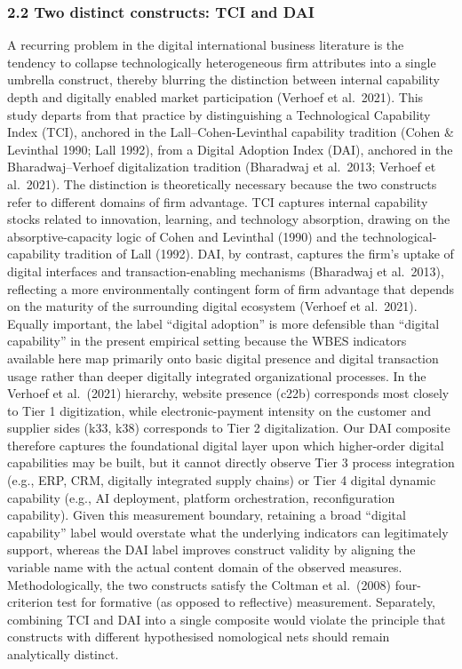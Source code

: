 \documentclass[
  12pt,a4paper]{article}
\begin{document}
\hypertarget{two-distinct-constructs-tci-and-dai}{%
\subsubsection{2.2 Two distinct constructs: TCI and
DAI}\label{two-distinct-constructs-tci-and-dai}}

A recurring problem in the digital international business literature is
the tendency to collapse technologically heterogeneous firm attributes
into a single umbrella construct, thereby blurring the distinction
between internal capability depth and digitally enabled market
participation (Verhoef et al.~2021). This study departs from that
practice by distinguishing a Technological Capability Index (TCI),
anchored in the Lall--Cohen-Levinthal capability tradition (Cohen \&
Levinthal 1990; Lall 1992), from a Digital Adoption Index (DAI),
anchored in the Bharadwaj--Verhoef digitalization tradition (Bharadwaj
et al.~2013; Verhoef et al.~2021). The distinction is theoretically
necessary because the two constructs refer to different domains of firm
advantage. TCI captures internal capability stocks related to
innovation, learning, and technology absorption, drawing on the
absorptive-capacity logic of Cohen and Levinthal (1990) and the
technological-capability tradition of Lall (1992). DAI, by contrast,
captures the firm's uptake of digital interfaces and
transaction-enabling mechanisms (Bharadwaj et al.~2013), reflecting a
more environmentally contingent form of firm advantage that depends on
the maturity of the surrounding digital ecosystem (Verhoef et al.~2021).
Equally important, the label ``digital adoption'' is more defensible
than ``digital capability'' in the present empirical setting because the
WBES indicators available here map primarily onto basic digital presence
and digital transaction usage rather than deeper digitally integrated
organizational processes. In the Verhoef et al.~(2021) hierarchy,
website presence (c22b) corresponds most closely to Tier 1 digitization,
while electronic-payment intensity on the customer and supplier sides
(k33, k38) corresponds to Tier 2 digitalization. Our DAI composite
therefore captures the foundational digital layer upon which
higher-order digital capabilities may be built, but it cannot directly
observe Tier 3 process integration (e.g., ERP, CRM, digitally integrated
supply chains) or Tier 4 digital dynamic capability (e.g., AI
deployment, platform orchestration, reconfiguration capability). Given
this measurement boundary, retaining a broad ``digital capability''
label would overstate what the underlying indicators can legitimately
support, whereas the DAI label improves construct validity by aligning
the variable name with the actual content domain of the observed
measures. Methodologically, the two constructs satisfy the Coltman et
al.~(2008) four-criterion test for formative (as opposed to reflective)
measurement. Separately, combining TCI and DAI into a single composite
would violate the principle that constructs with different hypothesised
nomological nets should remain analytically distinct.
\end{document}
